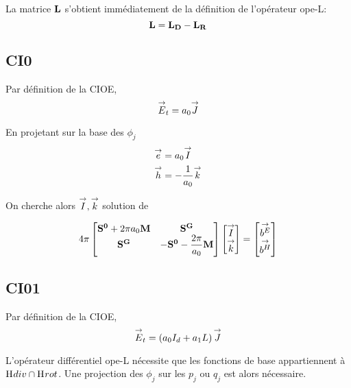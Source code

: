     La matrice \(\mathbf{L}\) s’obtient immédiatement de la définition de l'opérateur \gls{ope-L}: 
    \begin{equation}
      \mathbf{L} = \mathbf{L_D} - \mathbf{L_R}
    \end{equation}
        
    \subsection{CI0}
      Par définition de la CIOE,
      \begin{equation}
          {\overset{\rightarrow}{E}}_t = a_0 {\overset{\rightarrow}{J}}
      \end{equation}

      En projetant sur la base des \(\phi_j\)
      \begin{align}
        {\overset{\rightarrow}{e}} &= a_0 {\overset{\rightarrow}{I}} \\
        {\overset{\rightarrow}{h}} &= -\dfrac{1}{a_0} {\overset{\rightarrow}{k}}
      \end{align}

    On cherche alors \({\overset{\rightarrow}{I}},{\overset{\rightarrow}{k}}\) solution de 

    \begin{equation}
      4\pi
      \begin{bmatrix}
        \mathbf{S^0}+2\pi a_0 \mathbf{M} & \mathbf{S^G} \\
        \mathbf{S^G} & -\mathbf{S^0} - \dfrac{2\pi}{a_0}\mathbf{M}
      \end{bmatrix}
      \begin{bmatrix}
        {\overset{\rightarrow}{I}}\\
        {\overset{\rightarrow}{k}}
      \end{bmatrix}
      =
      \begin{bmatrix}
        {\overset{\rightarrow}{b^E}}\\
        {\overset{\rightarrow}{b^H}}
      \end{bmatrix}     
    \end{equation}

    \subsection{CI01}
      Par définition de la CIOE,
      \begin{equation}
          {\overset{\rightarrow}{E}}_t = \left(a_0I_d + a_1 L\right) {\overset{\rightarrow}{J}}
      \end{equation}

      L'opérateur différentiel \gls{ope-L} nécessite que les fonctions de base appartiennent à \(\mathrm{H}_\mathrm{{}}{div}\cap\mathrm{H}_\mathrm{{}}{rot}\). Une projection des $\phi_j$ sur les $p_j$ ou $q_j$ est alors nécessaire.

